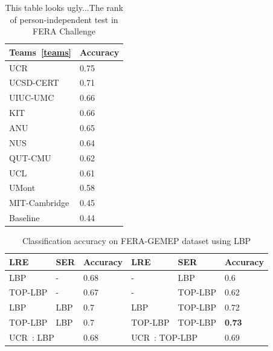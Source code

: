 \documentclass[journal]{IEEEtran}
\begin{document}
\begin{table}
\caption{\textcolor[rgb]{1,0,0}{This table looks ugly...}The rank of person-independent test in FERA Challenge\label{table:fera_team}}
\centering
\begin{tabular}{ll}
\toprule
	Teams~\ref{teams} & Accuracy \\ \midrule
	UCR 								& 0.75 \\ 
	UCSD-CERT						& 0.71 \\ 
	UIUC-UMC						& 0.66 \\ 
	KIT									& 0.66 \\ 
	ANU									& 0.65 \\ 
	NUS									& 0.64 \\ 
	QUT-CMU							& 0.62 \\ 
	UCL									& 0.61 \\ 
	UMont								& 0.58 \\ 
	MIT-Cambridge				& 0.45 \\ 
	Baseline						& 0.44 \\
\bottomrule
\end{tabular}
\end{table}



\begin{table}[!t]
\caption{Classification accuracy on FERA-GEMEP dataset using LBP\label{table:comp_lbp}}
\centering
\scriptsize
\begin{tabular}{lll||lll}
\toprule
LRE & SER & Accuracy	& LRE	& SER	& Accuracy \\ \midrule 
LBP	& -		& 0.68	& - & LBP & 0.6 \\
TOP-LBP & - & 0.67 & - & TOP-LBP & 0.62 \\
LBP & LBP & 0.7 & LBP & TOP-LBP & 0.72 \\
TOP-LBP & LBP & 0.7 & TOP-LBP & TOP-LBP & \textbf{0.73} \\ \midrule
\multicolumn{2}{l}{UCR~\cite{Yang_SMCB12}: LBP} & 0.68 & \multicolumn{2}{l}{UCR~\cite{Yang_SMCB12}: TOP-LBP} & 0.69 \\
\bottomrule

\end{tabular}
\end{table}
\end{document}
